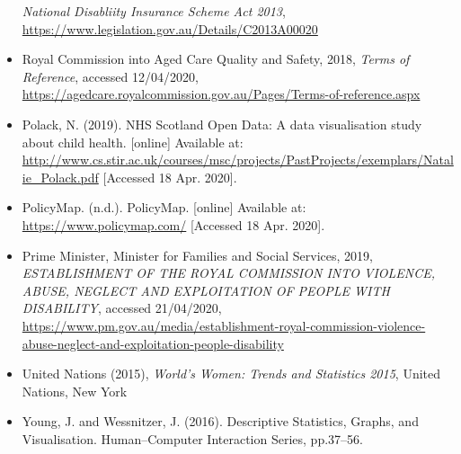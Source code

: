 \documentclass[11pt,]{article}
\begin{document}
\begin{itemize}
  \emph{National Disabliity Insurance Scheme Act 2013},
  \url{https://www.legislation.gov.au/Details/C2013A00020}
\item
  Royal Commission into Aged Care Quality and Safety, 2018, \emph{Terms
  of Reference}, accessed 12/04/2020,
  \url{https://agedcare.royalcommission.gov.au/Pages/Terms-of-reference.aspx}
\item
  Polack, N. (2019). NHS Scotland Open Data: A data visualisation study
  about child health. {[}online{]} Available at:
  \url{http://www.cs.stir.ac.uk/courses/msc/projects/PastProjects/exemplars/Natalie_Polack.pdf}
  {[}Accessed 18 Apr. 2020{]}.
\item
  PolicyMap. (n.d.). PolicyMap. {[}online{]} Available at:
  \url{https://www.policymap.com/} {[}Accessed 18 Apr. 2020{]}.
\item
  Prime Minister, Minister for Families and Social Services, 2019,
  \emph{ESTABLISHMENT OF THE ROYAL COMMISSION INTO VIOLENCE, ABUSE,
  NEGLECT AND EXPLOITATION OF PEOPLE WITH DISABILITY}, accessed
  21/04/2020,
  \url{https://www.pm.gov.au/media/establishment-royal-commission-violence-abuse-neglect-and-exploitation-people-disability}
\item
  United Nations (2015), \emph{World's Women: Trends and Statistics
  2015}, United Nations, New York
\item
  Young, J. and Wessnitzer, J. (2016). Descriptive Statistics, Graphs,
  and Visualisation. Human--Computer Interaction Series, pp.37--56.
\end{itemize}
\end{document}
